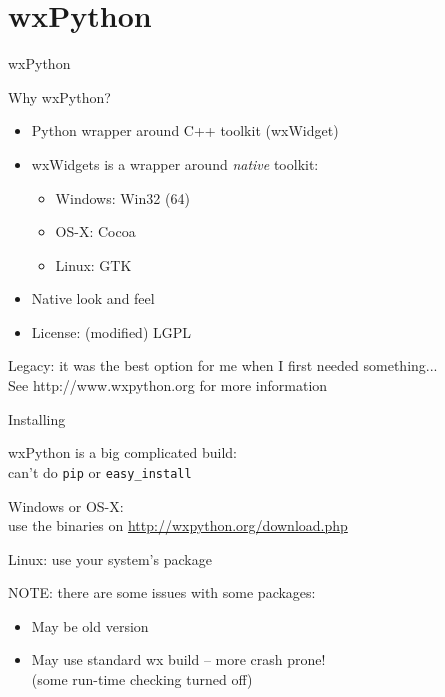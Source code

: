 \documentclass{beamer}
\begin{document}
\section{wxPython}

\begin{frame}[fragile]{wxPython}

{\Large Why wxPython?}

\begin{itemize}
  \item Python wrapper around C++ toolkit (wxWidget)
  \item wxWidgets is a wrapper around \emph{native} toolkit:
  \begin{itemize}
    \item Windows: Win32 (64)
    \item OS-X: Cocoa
    \item Linux: GTK
  \end{itemize}
  \item Native look and feel
  \item License: (modified) LGPL
\end{itemize}

\vfill
{\Large Legacy: it was the best option for me when I first needed something...}\\
See http://www.wxpython.org for more information

\end{frame}

\begin{frame}[fragile]{Installing}

{\Large wxPython is a big complicated build:\\
        can't do \verb`pip` or \verb`easy_install`}

\vfill
{\Large Windows or OS-X:\\
use the binaries on \url{http://wxpython.org/download.php}}

\vfill
{\Large Linux: use your system's package}

{\large NOTE: there are some issues with some packages:}
\begin{itemize}
    \item May be old version
    \item May use standard wx build -- more crash prone!\\ 
          (some run-time checking turned off)
\end{itemize}


\end{frame}
\end{document}
